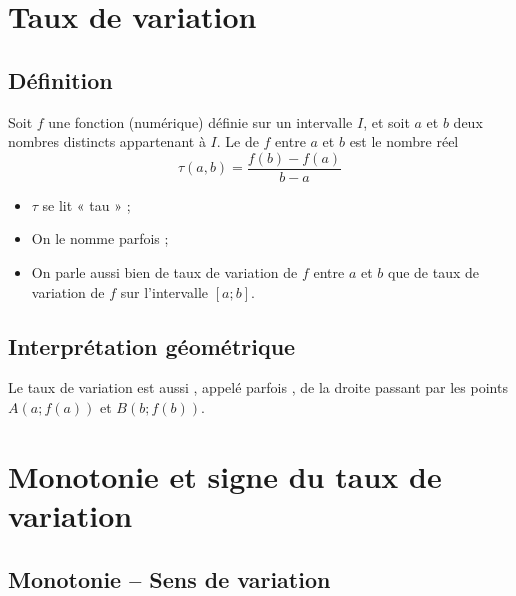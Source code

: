 \documentclass[12pt,a4paper,french]{book}
\begin{document}
\newpage

\section{Taux de variation}

\subsection{Définition}

\begin{defn}
Soit \( f \) une fonction (numérique) définie sur un intervalle \( I \), et soit \( a \) et \( b \) deux nombres distincts appartenant à \( I \). Le  de \( f \) entre \( a \) et \( b \) est le nombre réel
\[
\tau(a, b) = \frac{f(b) - f(a)}{b - a}
\]

\end{defn}

\begin{rem}
\begin{itemize}
    \item \( \tau \) se lit « tau » ;
    \item On le nomme parfois  ;
    \item On parle aussi bien de taux de variation de \( f \) entre \( a \) et \( b \) que de taux de variation de \( f \) sur l’intervalle \( [a ; b] \).
\end{itemize}
\end{rem}

\subsection{Interprétation géométrique}

\begin{rem}
Le taux de variation est aussi , appelé parfois , de la droite passant par les points \( A(a ; f(a)) \) et \( B(b ; f(b)) \).
\end{rem}

\section{Monotonie et signe du taux de variation}

\subsection{Monotonie – Sens de variation}
\end{document}
